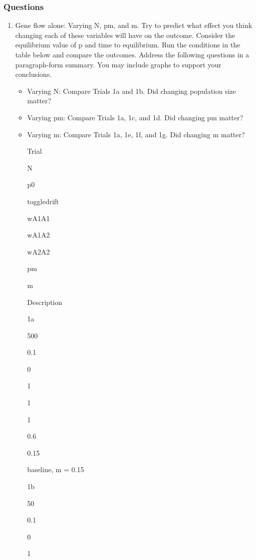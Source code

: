 \subsubsection{Questions}\label{questions}

\begin{enumerate}
\def\labelenumi{\arabic{enumi}.}
\item
  Gene flow alone: Varying N, pm, and m. Try to predict what effect you
  think changing each of these variables will have on the outcome.
  Consider the equilibrium value of p and time to equilibrium. Run the
  conditions in the table below and compare the outcomes. Address the
  following questions in a paragraph-form summary. You may include
  graphs to support your conclusions.

  \begin{itemize}
  \tightlist
  \item
    Varying N: Compare Trials 1a and 1b. Did changing population size
    matter?\\
  \item
    Varying pm: Compare Trials 1a, 1c, and 1d. Did changing pm matter?\\
  \item
    Varying m: Compare Trials 1a, 1e, 1f, and 1g. Did changing m matter?

    Trial

    N

    p0

    toggledrift

    wA1A1

    wA1A2

    wA2A2

    pm

    m

    Description

    1a

    500

    0.1

    0

    1

    1

    1

    0.6

    0.15

    baseline, m = 0.15

    1b

    50

    0.1

    0

    1


\end{itemize}
\end{enumerate}
